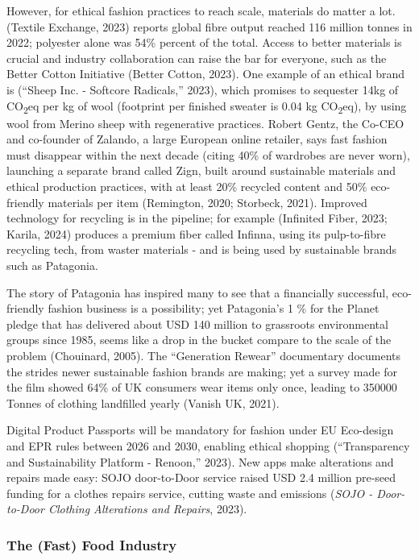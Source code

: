 \documentclass[
  12pt,
  letterpaper,
  DIV=11,
  numbers=noendperiod]{scrartcl}
\begin{document}
However, for ethical fashion practices to reach scale, materials do
matter a lot. (Textile Exchange, 2023) reports global fibre output
reached 116 million tonnes in 2022; polyester alone was 54\% percent of
the total. Access to better materials is crucial and industry
collaboration can raise the bar for everyone, such as the Better Cotton
Initiative (Better Cotton, 2023). One example of an ethical brand is
({``Sheep {Inc}. - {Softcore Radicals},''} 2023), which promises to
sequester 14kg of CO\textsubscript{2}eq per kg of wool (footprint per
finished sweater is 0.04 kg CO\textsubscript{2}eq), by using wool from
Merino sheep with regenerative practices. Robert Gentz, the Co-CEO and
co-founder of Zalando, a large European online retailer, says fast
fashion must disappear within the next decade (citing 40\% of wardrobes
are never worn), launching a separate brand called Zign, built around
sustainable materials and ethical production practices, with at least
20\% recycled content and 50\% eco-friendly materials per item
(Remington, 2020; Storbeck, 2021). Improved technology for recycling is
in the pipeline; for example (Infinited Fiber, 2023; Karila, 2024)
produces a premium fiber called Infinna, using its pulp-to-fibre
recycling tech, from waster materials - and is being used by sustainable
brands such as Patagonia.

The story of Patagonia has inspired many to see that a financially
successful, eco-friendly fashion business is a possibility; yet
Patagonia's 1 \% for the Planet pledge that has delivered about USD 140
million to grassroots environmental groups since 1985, seems like a drop
in the bucket compare to the scale of the problem (Chouinard, 2005). The
``Generation Rewear'' documentary documents the strides newer
sustainable fashion brands are making; yet a survey made for the film
showed 64\% of UK consumers wear items only once, leading to 350000
Tonnes of clothing landfilled yearly (Vanish UK, 2021).

Digital Product Passports will be mandatory for fashion under EU
Eco-design and EPR rules between 2026 and 2030, enabling ethical
shopping ({``Transparency and Sustainability Platform - {Renoon},''}
2023). New apps make alterations and repairs made easy: SOJO
door-to-Door service raised USD 2.4 million pre-seed funding for a
clothes repairs service, cutting waste and emissions (\emph{{SOJO} -
Door-to-Door Clothing Alterations and Repairs}, 2023).

\subsubsection{The (Fast) Food Industry}\label{the-fast-food-industry}
\end{document}

